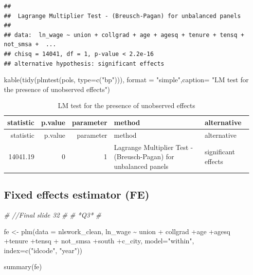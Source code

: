 \documentclass[
]{article}
\newenvironment{Shaded}{\begin{snugshade}}{\end{snugshade}}
\newcommand{\AttributeTok}[1]{\textcolor[rgb]{0.77,0.63,0.00}{#1}}
\newcommand{\CommentTok}[1]{\textcolor[rgb]{0.56,0.35,0.01}{\textit{#1}}}
\newcommand{\FunctionTok}[1]{\textcolor[rgb]{0.00,0.00,0.00}{#1}}
\newcommand{\NormalTok}[1]{#1}
\newcommand{\OtherTok}[1]{\textcolor[rgb]{0.56,0.35,0.01}{#1}}
\newcommand{\SpecialCharTok}[1]{\textcolor[rgb]{0.00,0.00,0.00}{#1}}
\newcommand{\StringTok}[1]{\textcolor[rgb]{0.31,0.60,0.02}{#1}}
\begin{document}
\begin{verbatim}
## 
##  Lagrange Multiplier Test - (Breusch-Pagan) for unbalanced panels
## 
## data:  ln_wage ~ union + collgrad + age + agesq + tenure + tensq + not_smsa +  ...
## chisq = 14041, df = 1, p-value < 2.2e-16
## alternative hypothesis: significant effects
\end{verbatim}

\begin{Shaded}
\begin{Highlighting}[]
  \FunctionTok{kable}\NormalTok{(}\FunctionTok{tidy}\NormalTok{(}\FunctionTok{plmtest}\NormalTok{(pols, }\AttributeTok{type=}\FunctionTok{c}\NormalTok{(}\StringTok{"bp"}\NormalTok{))), }\AttributeTok{format =} \StringTok{"simple"}\NormalTok{,}\AttributeTok{caption=}
          \StringTok{"LM test for the presence of unobserved effects"}\NormalTok{)}
\end{Highlighting}
\end{Shaded}

\begin{longtable}[]{@{}rrrll@{}}
\caption{LM test for the presence of unobserved effects}\tabularnewline
\toprule()
statistic & p.value & parameter & method & alternative \\
\midrule()
\endfirsthead
\toprule()
statistic & p.value & parameter & method & alternative \\
\midrule()
\endhead
14041.19 & 0 & 1 & Lagrange Multiplier Test - (Breusch-Pagan) for
unbalanced panels & significant effects \\
\bottomrule()
\end{longtable}

\hypertarget{fixed-effects-estimator-fe}{%
\subsection{Fixed effects estimator
(FE)}\label{fixed-effects-estimator-fe}}

\begin{Shaded}
\begin{Highlighting}[]
\CommentTok{\# //Final slide 32}
\CommentTok{\# }
\CommentTok{\# *Q3*}
\CommentTok{\#}

\NormalTok{  fe }\OtherTok{\textless{}{-}} \FunctionTok{plm}\NormalTok{(}\AttributeTok{data =}\NormalTok{ nlswork\_clean, ln\_wage }\SpecialCharTok{\textasciitilde{}}\NormalTok{ union }\SpecialCharTok{+}
\NormalTok{              collgrad }\SpecialCharTok{+}\NormalTok{age }\SpecialCharTok{+}\NormalTok{agesq }\SpecialCharTok{+}\NormalTok{tenure }\SpecialCharTok{+}\NormalTok{tensq }\SpecialCharTok{+}
\NormalTok{              not\_smsa }\SpecialCharTok{+}\NormalTok{south }\SpecialCharTok{+}\NormalTok{c\_city, }\AttributeTok{model=}\StringTok{"within"}\NormalTok{, }\AttributeTok{index=}\FunctionTok{c}\NormalTok{(}\StringTok{"idcode"}\NormalTok{, }\StringTok{"year"}\NormalTok{))}
      
      \FunctionTok{summary}\NormalTok{(fe)}
\end{Highlighting}
\end{Shaded}
\end{document}
